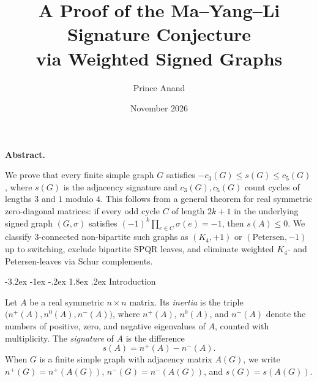 \documentclass[10pt,letterpaper]{article}
\title{\LARGE A Proof of the Ma--Yang--Li Signature Conjecture\\via Weighted Signed Graphs}
\author{\large Prince Anand}
\date{\normalsize November 2026}
\makeatletter
\renewcommand\section{\@startsection{section}{1}{\z@}%
  {-3.2ex \@plus -1ex \@minus -.2ex}%
  {1.8ex \@plus .2ex}%
  {\normalfont\large\bfseries}}
\renewenvironment{abstract}{%
  \begin{list}{}{%
    \setlength{\leftmargin}{0.45in}%
    \setlength{\rightmargin}{0.45in}%
    \setlength{\topsep}{0pt}%
    \setlength{\partopsep}{0pt}%
  }%
  \item\relax\small\textbf{Abstract.}\ %
}{%
  \end{list}\vspace{0.8em}%
}
\theoremstyle{zetaplain}
\theoremstyle{zetadef}
\theoremstyle{remark}
\numberwithin{equation}{section}
\makeatother
\begin{document}
\maketitle

\begin{abstract}
We prove that every finite simple graph $G$ satisfies $-c_3(G) \le s(G) \le c_5(G)$, where $s(G)$ is the adjacency signature and $c_3(G), c_5(G)$ count cycles of lengths $3$ and $1$ modulo $4$. This follows from a general theorem for real symmetric zero-diagonal matrices: if every odd cycle $C$ of length $2k+1$ in the underlying signed graph $(G,\sigma)$ satisfies $(-1)^k \prod_{e\in C}\sigma(e) = -1$, then $s(A) \le 0$. We classify $3$-connected non-bipartite such graphs as $(K_4,+1)$ or $(\mathrm{Petersen},-1)$ up to switching, exclude bipartite SPQR leaves, and eliminate weighted $K_4$- and Petersen-leaves via Schur complements.
\end{abstract}

\section{Introduction}\label{sec:intro}

Let $A$ be a real symmetric $n \times n$ matrix. Its \emph{inertia} is the triple $\bigl(n^+(A), n^0(A), n^-(A)\bigr)$, where $n^+(A)$, $n^0(A)$, and $n^-(A)$ denote the numbers of positive, zero, and negative eigenvalues of $A$, counted with multiplicity. The \emph{signature} of $A$ is the difference
\[
  s(A) = n^+(A) - n^-(A).
\]
When $G$ is a finite simple graph with adjacency matrix $A(G)$, we write $n^+(G) = n^+(A(G))$, $n^-(G) = n^-(A(G))$, and $s(G) = s(A(G))$.
\end{document}
